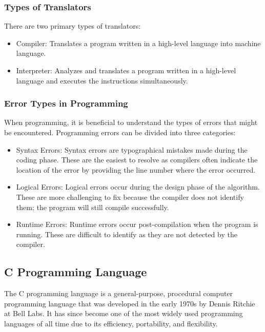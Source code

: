 \subsubsection{Types of Translators}
There are two primary types of translators:
\begin{itemize}
    \item Compiler: Translates a program written in a high-level language into machine language.
    \item Interpreter: Analyzes and translates a program written in a high-level language and executes the instructions simultaneously.
\end{itemize}

\subsubsection{Error Types in Programming}
When programming, it is beneficial to understand the types of errors that might be encountered. Programming errors can be divided into three categories:
\begin{itemize}
    \item Syntax Errors: Syntax errors are typographical mistakes made during the coding phase. These are the easiest to resolve as compilers often indicate the location of the error by providing the line number where the error occurred.
    \item Logical Errors: Logical errors occur during the design phase of the algorithm. These are more challenging to fix because the compiler does not identify them; the program will still compile successfully.
    \item Runtime Errors: Runtime errors occur post-compilation when the program is running. These are difficult to identify as they are not detected by the compiler.
\end{itemize}


\subsection{C Programming Language}

The C programming language is a general-purpose, procedural computer programming language that was developed in the early 1970s by Dennis Ritchie at Bell Labs. It has since become one of the most widely used programming languages of all time due to its efficiency, portability, and flexibility.

